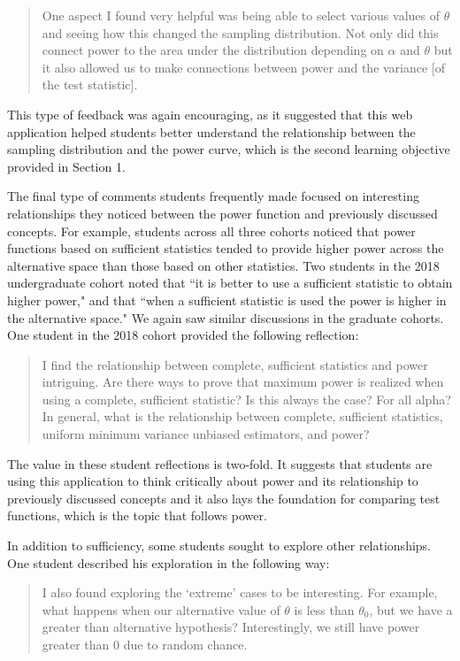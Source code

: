 \documentclass{TISE}
\begin{document}
\begin{quote}
	One aspect I found very helpful was being able to select various values of $\theta$ and seeing how this changed the sampling distribution. Not only did this connect power to the area under the distribution depending on $\alpha$ and $\theta$ but it also allowed us to make connections between power and the variance [of the test statistic]. 
\end{quote}

This type of feedback was again encouraging, as it suggested that this web application helped students better understand the relationship between the sampling distribution and the power curve, which is the second learning objective provided in Section 1. 

The final type of comments students frequently made focused on interesting relationships they noticed between the power function and previously discussed concepts. For example, students across all three cohorts noticed that power functions based on sufficient statistics tended to provide higher power across the alternative space than those based on other statistics. Two students in the 2018 undergraduate cohort noted that ``it is better to use a sufficient statistic to obtain higher power," and that ``when a sufficient statistic is used the power is higher in the alternative space." We again saw similar discussions in the graduate cohorts. One student in the 2018 cohort provided the following reflection:

\begin{quote}
	I find the relationship between complete, sufficient statistics and power intriguing. Are there ways to prove that maximum power is realized when using a complete, sufficient statistic? Is this always the case? For all alpha? In general, what is the relationship between complete, sufficient statistics, uniform minimum variance unbiased estimators, and power?
\end{quote}

The value in these student reflections is two-fold. It suggests that students are using this application to think critically about power and its relationship to previously discussed concepts and it also lays the foundation for comparing test functions, which is the topic that follows power. 

In addition to sufficiency, some students sought to explore other relationships. One student described his exploration in the following way:

\begin{quote}
	I also found exploring the `extreme' cases to be interesting. For example, what happens when our alternative value of $\theta$ is less than $\theta_0$, but we have a greater than alternative hypothesis? Interestingly, we still have power greater than 0 due to random chance.
\end{quote}
\end{document}
